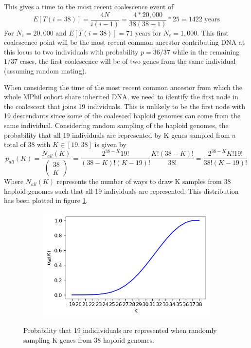 \documentclass{article}
\begin{document}
This gives a time to the most recent coalescence event of
\begin{equation}
E[T(i=38)] =  \dfrac{4N}{i(i-1)} = \dfrac{4*20,000}{38(38-1)} *25 =1422 \text{ years}
\end{equation}
For $N_e = 20,000$ and $E[T(i=38)] = 71 \text{ years}$ for $N_e = 1,000$. This first coalescence point will be the most recent common ancestor contributing DNA at this locus to two individuals with probability $p = 36/37$ while in the remaining $1/37$ cases, the first coalescence will be of two genes from the same individual (assuming random mating).

When considering the time of the most recent common ancestor from which the whole MPhil cohort share inherited DNA, we need to identify the first node in the coalescent that joins 19 individuals. This is unlikely to be the first node with 19 descendants since some of the coalesced haploid genomes can come from the same individual. Considering random sampling of the haploid genomes, the probability that all 19 individuals are represented by K genes sampled from a total of 38 with $K \in [19, 38]$ is given by
\begin{equation}
p_{all}(K) = \dfrac{N_{all}(K)}{\begin{pmatrix} 38 \\ K \end{pmatrix}} = \dfrac{2^{38-K} 19!}{(38-K)! (K-19)!} \dfrac{K! (38-K)!}{38!} = \dfrac{2^{38-K} K! 19!}{38!(K-19)!}
\end{equation}
Where $N_{all}(K)$ represents the number of ways to draw K samples from 38 haploid genomes such that all 19 individuals are represented. This distribution has been plotted in figure \ref{fig:sampKs}.

\begin{figure}[h]
	\centering
	\begin{subfigure}[t]{0.45\linewidth}
		\centering
		\includegraphics[width = 1.0\linewidth, trim={0 0 0 0}, clip=true]{figures/samp_K.png}
	\end{subfigure}
\caption{Probability that 19 indidividuals are represented when randomly sampling K genes from 38 haploid genomes.}
\label{fig:sampKs}
\end{figure}
\end{document}
